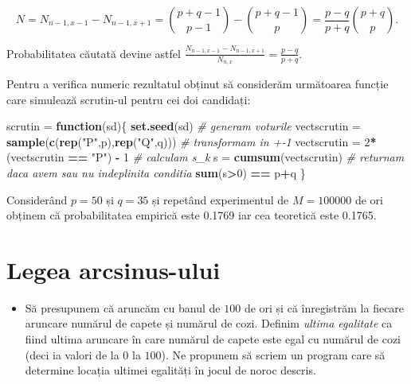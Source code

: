 \documentclass[]{article}
\newenvironment{Shaded}{\begin{snugshade}}{\end{snugshade}}
\newcommand{\KeywordTok}[1]{\textcolor[rgb]{0.13,0.29,0.53}{\textbf{#1}}}
\newcommand{\DecValTok}[1]{\textcolor[rgb]{0.00,0.00,0.81}{#1}}
\newcommand{\StringTok}[1]{\textcolor[rgb]{0.31,0.60,0.02}{#1}}
\newcommand{\CommentTok}[1]{\textcolor[rgb]{0.56,0.35,0.01}{\textit{#1}}}
\newcommand{\ControlFlowTok}[1]{\textcolor[rgb]{0.13,0.29,0.53}{\textbf{#1}}}
\newcommand{\OperatorTok}[1]{\textcolor[rgb]{0.81,0.36,0.00}{\textbf{#1}}}
\newcommand{\NormalTok}[1]{#1}
\newenvironment{frshaded*}{%
  \def\FrameCommand{\fboxrule=\FrameRule\fboxsep=\FrameSep \fcolorbox{framecolor}{shadecolor1}}%
  \MakeFramed {\advance\hsize-\width \FrameRestore}}%
{\endMakeFramed}
\newenvironment{rmdblock}[1]
  {\begin{frshaded*}
  \begin{itemize}
  \renewcommand{\labelitemi}{
    \raisebox{-.7\height}[0pt][0pt]{
      {\setkeys{Gin}{width=2em,keepaspectratio}\texttt{[image: images/icons/\#1]}}
    }
  }
  \item
  }
  {
  \end{itemize}
  \end{frshaded*}
  }
\newenvironment{rmdexercise}
  {\begin{rmdblock}{exercise}}
  {\end{rmdblock}}
\begin{document}
\[
  N = N_{n-1,x-1} - N_{n-1,x+1} = \binom{p+q-1}{p-1} - \binom{p+q-1}{p} = \frac{p-q}{p+q}\binom{p+q}{p}.
\]

Probabilitatea căutată devine astfel
\(\frac{N_{n-1,x-1} - N_{n-1,x+1}}{N_{n,x}} = \frac{p-q}{p+q}\).

Pentru a verifica numeric rezultatul obținut să considerăm următoarea
funcție care simulează scrutin-ul pentru cei doi candidați:

\begin{Shaded}
\begin{Highlighting}[]
\NormalTok{scrutin =}\StringTok{ }\ControlFlowTok{function}\NormalTok{(sd)\{}
  \KeywordTok{set.seed}\NormalTok{(sd)}
  \CommentTok{# generam voturile}
\NormalTok{  vectscrutin =}\StringTok{ }\KeywordTok{sample}\NormalTok{(}\KeywordTok{c}\NormalTok{(}\KeywordTok{rep}\NormalTok{(}\StringTok{"P"}\NormalTok{,p),}\KeywordTok{rep}\NormalTok{(}\StringTok{"Q"}\NormalTok{,q)))}
  \CommentTok{# transformam in +-1 }
\NormalTok{  vectscrutin =}\StringTok{ }\DecValTok{2}\OperatorTok{*}\NormalTok{(vectscrutin }\OperatorTok{==}\StringTok{ "P"}\NormalTok{) }\OperatorTok{-}\StringTok{ }\DecValTok{1}
  \CommentTok{# calculam s_k}
\NormalTok{  s =}\StringTok{ }\KeywordTok{cumsum}\NormalTok{(vectscrutin)}
  \CommentTok{# returnam daca avem sau nu indeplinita conditia}
  \KeywordTok{sum}\NormalTok{(s}\OperatorTok{>}\DecValTok{0}\NormalTok{) }\OperatorTok{==}\StringTok{ }\NormalTok{p}\OperatorTok{+}\NormalTok{q}
\NormalTok{\}}
\end{Highlighting}
\end{Shaded}

Considerând \(p = 50\) și \(q = 35\) și repetând experimentul de
\(M = 100000\) de ori obținem că probabilitatea empirică este 0.1769 iar
cea teoretică este 0.1765.

\section{Legea arcsinus-ului}\label{legea-arcsinus-ului}

\begin{rmdexercise}
Să presupunem că aruncăm cu banul de \(100\) de ori și că înregistrăm la
fiecare aruncare numărul de capete și numărul de cozi. Definim
\emph{ultima egalitate} ca fiind ultima aruncare în care numărul de
capete este egal cu numărul de cozi (deci ia valori de la \(0\) la
\(100\)). Ne propunem să scriem un program care să determine locația
ultimei egalități în jocul de noroc descris.
\end{rmdexercise}
\end{document}
